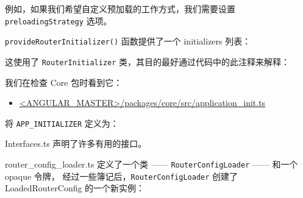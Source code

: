 


例如，如果我们希望自定义预加载的工作方式，我们需要设置 \texttt{preloadingStrategy} 选项。


\texttt{provideRouterInitializer()} 函数提供了一个 initializers 列表：




这使用了 \texttt{RouterInitializer} 类，其目的最好通过代码中的此注释来解释：




我们在检查 Core 包时看到它：

\begin{itemize}
  \item \href{https://github.com/angular/angular/blob/master/packages/core/src/application_init.ts}
        {<ANGULAR\_MASTER>/packages/core/src/application\_init.ts}
\end{itemize}


将 \texttt{APP\_INITIALIZER} 定义为：




Interfaces.ts 声明了许多有用的接口。




router\_config\_loader.ts 定义了一个类 —— \texttt{RouterConfigLoader} —— 和一个 opaque 令牌，
经过一些簿记后，\texttt{RouterConfigLoader} 创建了 LoadedRouterConfig 的一个新实例：

